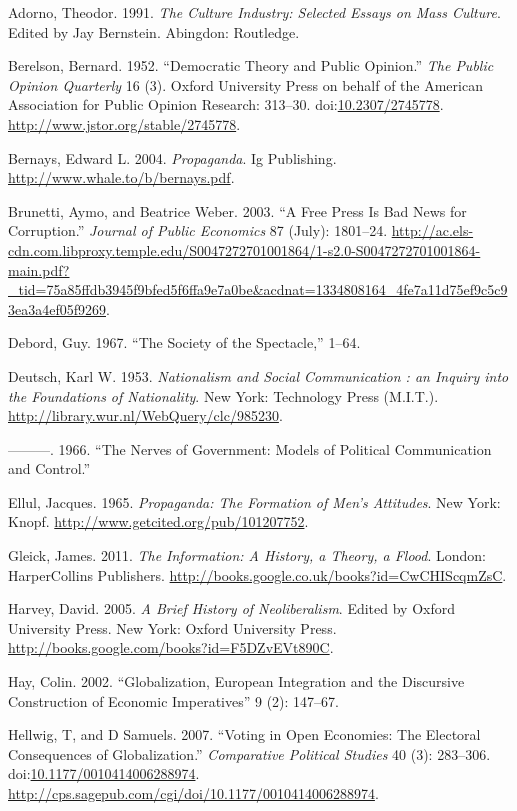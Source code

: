 \documentclass[12pt,book]{article}
\begin{document}
Adorno, Theodor. 1991. \emph{The Culture Industry: Selected Essays on
Mass Culture}. Edited by Jay Bernstein. Abingdon: Routledge.

Berelson, Bernard. 1952. ``Democratic Theory and Public Opinion.''
\emph{The Public Opinion Quarterly} 16 (3). Oxford University Press on
behalf of the American Association for Public Opinion Research: 313--30.
doi:\href{http://dx.doi.org/10.2307/2745778}{10.2307/2745778}.
\url{http://www.jstor.org/stable/2745778}.

Bernays, Edward L. 2004. \emph{Propaganda}. Ig Publishing.
\url{http://www.whale.to/b/bernays.pdf}.

Brunetti, Aymo, and Beatrice Weber. 2003. ``A Free Press Is Bad News for
Corruption.'' \emph{Journal of Public Economics} 87 (July): 1801--24.
\url{http://ac.els-cdn.com.libproxy.temple.edu/S0047272701001864/1-s2.0-S0047272701001864-main.pdf?_tid=75a85ffdb3945f9bfed5f6ffa9e7a0be\&acdnat=1334808164_4fe7a11d75ef9c5c93ea3a4ef05f9269}.

Debord, Guy. 1967. ``The Society of the Spectacle,'' 1--64.

Deutsch, Karl W. 1953. \emph{Nationalism and Social Communication : an
Inquiry into the Foundations of Nationality}. New York: Technology Press
(M.I.T.). \url{http://library.wur.nl/WebQuery/clc/985230}.

---------. 1966. ``The Nerves of Government: Models of Political
Communication and Control.''

Ellul, Jacques. 1965. \emph{Propaganda: The Formation of Men's
Attitudes}. New York: Knopf.
\url{http://www.getcited.org/pub/101207752}.

Gleick, James. 2011. \emph{The Information: A History, a Theory, a
Flood}. London: HarperCollins Publishers.
\url{http://books.google.co.uk/books?id=CwCHIScqmZsC}.

Harvey, David. 2005. \emph{A Brief History of Neoliberalism}. Edited by
Oxford University Press. New York: Oxford University Press.
\url{http://books.google.com/books?id=F5DZvEVt890C}.

Hay, Colin. 2002. ``Globalization, European Integration and the
Discursive Construction of Economic Imperatives'' 9 (2): 147--67.

Hellwig, T, and D Samuels. 2007. ``Voting in Open Economies: The
Electoral Consequences of Globalization.'' \emph{Comparative Political
Studies} 40 (3): 283--306.
doi:\href{http://dx.doi.org/10.1177/0010414006288974}{10.1177/0010414006288974}.
\url{http://cps.sagepub.com/cgi/doi/10.1177/0010414006288974}.
\end{document}
